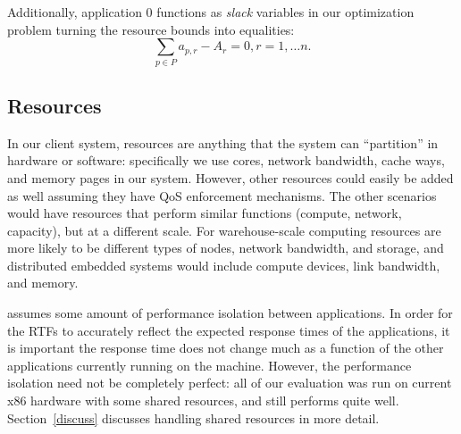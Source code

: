 Additionally, application 0 functions as \emph{slack} variables in our optimization problem turning the resource bounds into equalities:
\begin{equation}
\sum_{p\in P} a_{p,r} - A_r = 0, r = 1,\dots n.
\end{equation}

\subsection*{Resources}
In our client system, resources are anything that the system can ``partition'' in hardware or software: specifically we use cores, network bandwidth, cache ways, and memory pages in our system.  However, other resources could easily be added as well assuming they have QoS enforcement mechanisms.  The other scenarios would have resources that perform similar functions (compute, network, capacity), but at a different scale. For warehouse-scale computing resources are more likely to be different types of nodes, network bandwidth, and storage, and distributed embedded systems would include compute devices, link bandwidth, and memory.

\pacora assumes some amount of performance isolation between applications.  In order for the RTFs to accurately reflect the expected response times of the applications, it is important the response time does not change much as a function of the other applications currently running on the machine.   However, the performance isolation need not be completely perfect: all of our evaluation was run on current x86 hardware with some shared resources, and \pacora still performs quite well. Section~\ref{discuss} discusses handling shared resources in more detail.



